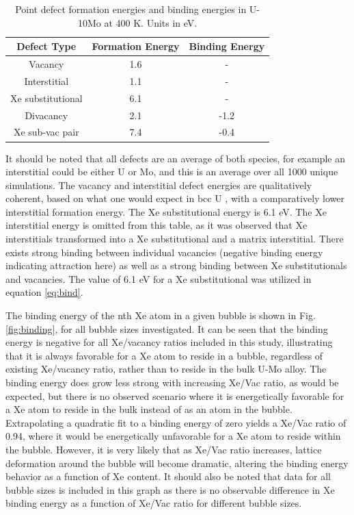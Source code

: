\documentclass[review]{elsarticle}
\begin{document}
\begin{table}[h!]
\caption{Point defect formation energies and binding energies in U-10Mo at 400 K. Units in eV. }
\label{tab:defects}
\begin{center}
\begin{tabular}{|c|c|c|}
     \hline
Defect Type & Formation Energy & Binding Energy  \\
\hline
Vacancy & 1.6 & -  \\
Interstitial & 1.1 & - \\
Xe substitutional & 6.1 & - \\
Divacancy & 2.1 & -1.2 \\
Xe sub-vac pair & 7.4 & -0.4  \\
     \hline
\end{tabular}
\end{center}
\label{default}
\end{table}%

It should be noted that all defects are an average of both species, for example an interstitial could be either U or Mo, and this is an average over all 1000 unique simulations. The vacancy and interstitial defect energies are qualitatively coherent, based on what one would expect in bcc U \cite{beeler2010}, with a comparatively lower interstitial formation energy. The Xe substitutional energy is 6.1 eV. The Xe interstitial energy is omitted from this table, as it was observed that Xe interstitials transformed into a Xe substitutional and a matrix interstitial. There exists strong binding between individual vacancies (negative binding energy indicating attraction here) as well as a strong binding between Xe substitutionals and vacancies. The value of 6.1 eV for a Xe substitutional was utilized in equation \ref{eq:bind}.

The binding energy of the nth Xe atom in a given bubble is shown in Fig. \ref{fig:binding}, for all bubble sizes investigated. It can be seen that the binding energy is negative for all Xe/vacancy ratios included in this study, illustrating that it is always favorable for a Xe atom to reside in a bubble, regardless of existing Xe/vacancy ratio, rather than to reside in the bulk U-Mo alloy. The binding energy does grow less strong with increasing Xe/Vac ratio, as would be expected, but there is no observed scenario where it is energetically favorable for a Xe atom to reside in the bulk instead of as an atom in the bubble. Extrapolating a quadratic fit to a binding energy of zero yields a Xe/Vac ratio of 0.94, where it would be energetically unfavorable for a Xe atom to reside within the bubble. However, it is very likely that as Xe/Vac ratio increases, lattice deformation around the bubble will become dramatic, altering the binding energy behavior as a function of Xe content. It should also be noted that data for all bubble sizes is included in this graph as there is no observable difference in Xe binding energy as a function of Xe/Vac ratio for different bubble sizes. 
\end{document}
